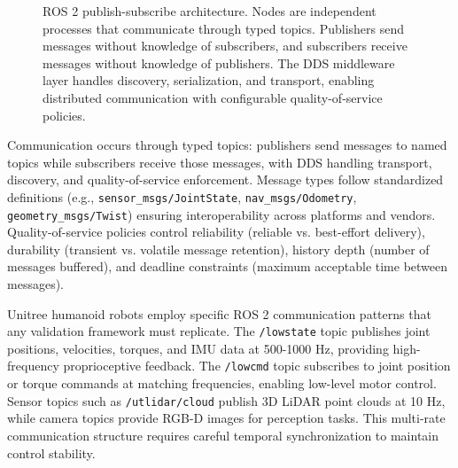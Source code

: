 \documentclass[12pt,a4paper]{article}
\begin{document}
\begin{figure}[H]
\caption[ROS 2 pub-sub architecture]{ROS 2 publish-subscribe architecture. Nodes are independent processes that communicate through typed topics. Publishers send messages without knowledge of subscribers, and subscribers receive messages without knowledge of publishers. The DDS middleware layer handles discovery, serialization, and transport, enabling distributed communication with configurable quality-of-service policies.}
\label{fig:ros2_architecture}
\end{figure}

Communication occurs through typed topics: publishers send messages to named topics while subscribers receive those messages, with DDS handling transport, discovery, and quality-of-service enforcement. Message types follow standardized definitions (e.g., \texttt{sensor\_msgs/JointState}, \texttt{nav\_msgs/Odometry}, \texttt{geometry\_msgs/Twist}) ensuring interoperability across platforms and vendors. Quality-of-service policies control reliability (reliable vs. best-effort delivery), durability (transient vs. volatile message retention), history depth (number of messages buffered), and deadline constraints (maximum acceptable time between messages).

Unitree humanoid robots employ specific ROS 2 communication patterns that any validation framework must replicate. The \texttt{/lowstate} topic publishes joint positions, velocities, torques, and IMU data at 500-1000 Hz, providing high-frequency proprioceptive feedback. The \texttt{/lowcmd} topic subscribes to joint position or torque commands at matching frequencies, enabling low-level motor control. Sensor topics such as \texttt{/utlidar/cloud} publish 3D LiDAR point clouds at 10 Hz, while camera topics provide RGB-D images for perception tasks. This multi-rate communication structure requires careful temporal synchronization to maintain control stability.
\end{document}
